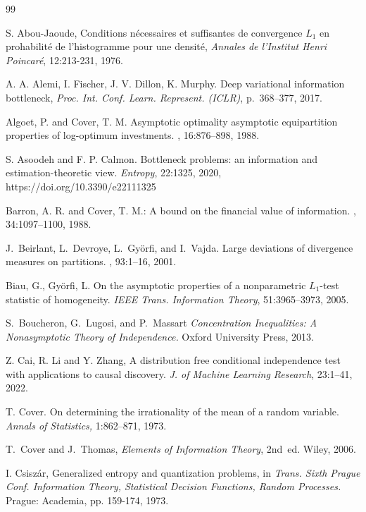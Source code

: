 \documentclass[11pt]{article}
\begin{document}
\begin{thebibliography}{99}

S. Abou-Jaoude, 
Conditions n\'ecessaires et suffisantes de convergence $L_1$
en prohabilit\'e de l’histogramme pour une densit\'e, 
{\em Annales de l’Institut Henri Poincar\'e},  12:213-231, 1976.

A. A. Alemi, I. Fischer, J. V. Dillon,  K. Murphy. Deep variational information bottleneck, \emph{Proc. Int. Conf. Learn. Represent. (ICLR)},  p.~368–377, 2017.

Algoet, P. and Cover, T. M.
\newblock Asymptotic optimality asymptotic equipartition
properties of log-optimum investments.
,  16:876--898, 1988.

S. Asoodeh and F. P. Calmon. 
Bottleneck problems: an information and estimation-theoretic view.
{\it Entropy}, 22:1325, 2020, https://doi.org/10.3390/e22111325 

Barron, A. R. and Cover, T. M.:
\newblock A bound on the financial value of information.
, 34:1097--1100, 1988.

J.~Beirlant, L.~Devroye, L.~Gy{\"o}rfi, and I.~Vajda.
\newblock Large deviations of divergence measures on partitions.
, 93:1--16, 2001.

Biau, G., Gy\"orfi, L.
On the asymptotic properties of a nonparametric $L_1$-test statistic
  of homogeneity.
{\it IEEE Trans. Information Theory}, 51:3965--3973, 2005.

S.~Boucheron, G.~Lugosi, and P.~Massart \emph{Concentration
Inequalities: A Nonasymptotic Theory of Independence.} Oxford University
Press, 2013.

Z. Cai, R. Li and Y. Zhang,
A distribution free conditional independence test with applications to causal discovery.
{\it J. of Machine Learning Research}, 23:1--41, 2022.

T. Cover.
On determining the irrationality of the mean of a random variable.
{\it Annals of Statistics,} 1:862--871, 1973.

T.~Cover and J.~Thomas, \emph{Elements of Information Theory}, 2nd~ed. Wiley, 2006.

I. Csisz\'ar,  Generalized entropy and quantization problems, 
in {\em Trans. Sixth Prague Conf. Information Theory, Statistical Decision Functions,
Random Processes.} Prague: Academia, pp. 159-174, 1973.


\end{thebibliography}
\end{document}
